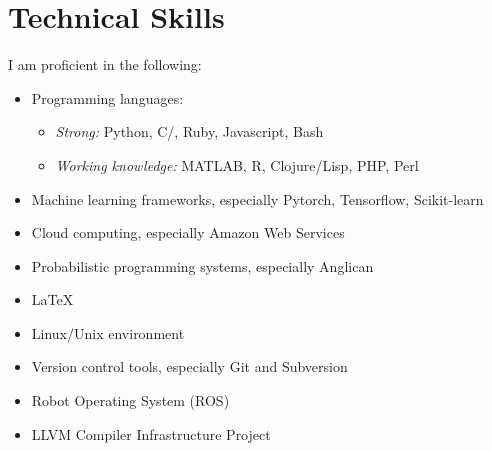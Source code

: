 \documentclass[12pt,a4paper]{article}
\begin{document}
\section*{Technical Skills}
I am proficient in the following:
\begin{itemize}
  \item Programming languages:
  \begin{itemize}
    \item \textit{Strong:} Python, C/\CPP, Ruby, Javascript, Bash
    \item \textit{Working knowledge:} MATLAB, R, Clojure/Lisp, PHP, Perl
  \end{itemize}
  \item Machine learning frameworks, especially Pytorch, Tensorflow, Scikit-learn
  \item Cloud computing, especially Amazon Web Services
  \item Probabilistic programming systems, especially Anglican
  \item {\LaTeX}
  \item Linux/Unix environment
  \item Version control tools, especially Git and Subversion
  \item Robot Operating System (ROS)
  \item LLVM Compiler Infrastructure Project
\end{itemize}
\end{document}
